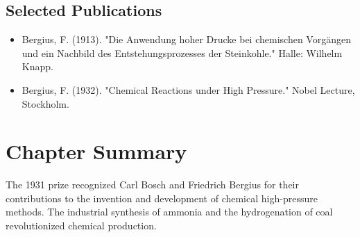\subsection*{Selected Publications}

\begin{itemize}

\item Bergius, F. (1913). "Die Anwendung hoher Drucke bei chemischen Vorgängen und ein Nachbild des Entstehungsprozesses der Steinkohle." Halle: Wilhelm Knapp.

\item Bergius, F. (1932). "Chemical Reactions under High Pressure." Nobel Lecture, Stockholm.

\end{itemize}

\clearpage

\section*{Chapter Summary}

The 1931 prize recognized Carl Bosch and Friedrich Bergius for their contributions to the invention and development of chemical high-pressure methods. The industrial synthesis of ammonia and the hydrogenation of coal revolutionized chemical production.
